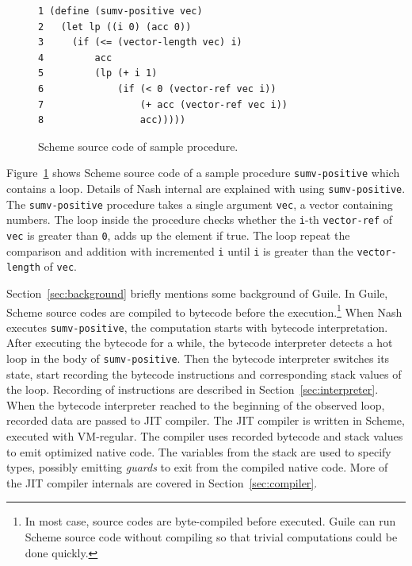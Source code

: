\documentclass[preprint, 10pt]{sigplanconf}
\begin{document}
\begin{figure}
  \begin{center}
    \small
\begin{verbatim}
1 (define (sumv-positive vec)
2   (let lp ((i 0) (acc 0))
3     (if (<= (vector-length vec) i)
4         acc
5         (lp (+ i 1)
6             (if (< 0 (vector-ref vec i))
7                 (+ acc (vector-ref vec i))
8                 acc)))))
\end{verbatim}
\end{center}
\caption{Scheme source code of sample procedure.}
\label{fig:scmloop}
\end{figure}

Figure~\hyperref[fig:scmloop]{\ref{fig:scmloop}} shows Scheme source code of a
sample procedure \texttt{sumv-positive} which contains a loop. Details of Nash
internal are explained with using \texttt{sumv-positive}. The
\texttt{sumv-positive} procedure takes a single argument \texttt{vec}, a
vector containing numbers. The loop inside the procedure checks whether the
\texttt{i}-th \texttt{vector-ref} of \texttt{vec} is greater than \texttt{0},
adds up the element if true. The loop repeat the comparison and addition with
incremented \texttt{i} until \texttt{i} is greater than the
\texttt{vector-length} of \texttt{vec}.

Section~\hyperref[sec:background]{\ref{sec:background}} briefly mentions some
background of Guile. In Guile, Scheme source codes are compiled to bytecode
before the execution.\footnote{In most case, source codes are byte-compiled
  before executed. Guile can run Scheme source code without compiling so that
  trivial computations could be done quickly.} When Nash executes
\texttt{sumv-positive}, the computation starts with bytecode
interpretation. After executing the bytecode for a while, the bytecode
interpreter detects a hot loop in the body of \texttt{sumv-positive}. Then the
bytecode interpreter switches its state, start recording the bytecode
instructions and corresponding stack values of the loop. Recording of
instructions are described in
Section~\hyperref[sec:interpreter]{\ref{sec:interpreter}}. When the bytecode
interpreter reached to the beginning of the observed loop, recorded data are
passed to JIT compiler. The JIT compiler is written in Scheme, executed with
VM-regular. The compiler uses recorded bytecode and stack values to emit
optimized native code. The variables from the stack are used to specify types,
possibly emitting \textit{guards} to exit from the compiled native code. More
of the JIT compiler internals are covered in
Section~\hyperref[sec:compiler]{\ref{sec:compiler}}.
\end{document}
